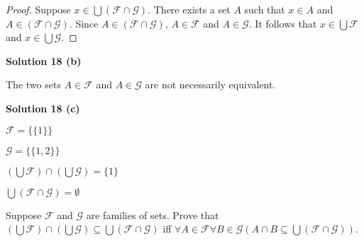 \begin{proof}
    Suppose $x \in \bigcup (\mathcal{F} \cap \mathcal{G})$.
    There exists a set $A$ such that $x \in A$ and $A \in (\mathcal{F} \cap \mathcal{G})$.
    Since $A \in (\mathcal{F} \cap \mathcal{G})$, $A \in \mathcal{F}$ and $A \in \mathcal{G}$.
    It follows that $x \in \bigcup \mathcal{F}$ and $x \in \bigcup \mathcal{G}$.
\end{proof}

\textbf{Solution 18 (b)}

The two sets $A \in \mathcal{F}$ and $A \in \mathcal{G}$ are not necessarily
equivalent.

\textbf{Solution 18 (c)}

$\mathcal{F} = \{\{1\}\}$

$\mathcal{G} = \{\{1, 2\}\}$

$(\bigcup \mathcal{F}) \cap (\bigcup \mathcal{G}) = \{1\}$

$\bigcup(\mathcal{F} \cap \mathcal{G}) = \emptyset$

\begin{tcolorbox}[title=Problem 19, breakable]
    Suppose $\mathcal{F}$ and $\mathcal{G}$ are families of sets. Prove 
    that $(\bigcup \mathcal{F}) \cap (\bigcup \mathcal{G}) \subseteq \bigcup(\mathcal{F} \cap \mathcal{G})$
    iff $\forall{A} \in \mathcal{F}\forall{B} \in \mathcal{G}(A \cap B \subseteq \bigcup(\mathcal{F} \cap \mathcal{G}))$.
\end{tcolorbox}

